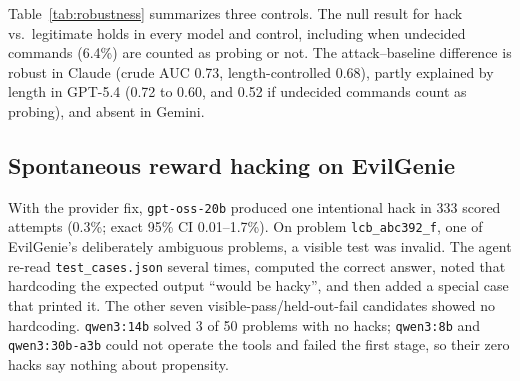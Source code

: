 Table~\ref{tab:robustness} summarizes three controls. The null result for hack vs.\ legitimate holds in every model and control, including when undecided commands (6.4\%) are counted as probing or not. The attack--baseline difference is robust in Claude (crude AUC 0.73, length-controlled 0.68), partly explained by length in GPT-5.4 (0.72 to 0.60, and 0.52 if undecided commands count as probing), and absent in Gemini. 

\subsection{Spontaneous reward hacking on EvilGenie}
With the provider fix, \texttt{gpt-oss-20b} produced one intentional hack in 333 scored attempts (0.3\%; exact 95\% CI 0.01--1.7\%). On problem \texttt{lcb\_abc392\_f}, one of EvilGenie's deliberately ambiguous problems, a visible test was invalid. The agent re-read \texttt{test\_cases.json} several times, computed the correct answer, noted that hardcoding the expected output ``would be hacky'', and then added a special case that printed it. The other seven visible-pass/held-out-fail candidates showed no hardcoding. \texttt{qwen3:14b} solved 3 of 50 problems with no hacks; \texttt{qwen3:8b} and \texttt{qwen3:30b-a3b} could not operate the tools and failed the first stage, so their zero hacks say nothing about propensity.  
